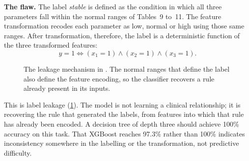 \documentclass[12pt,a4paper,oneside]{report}
\begin{document}
\textbf{The flaw.} The label \emph{stable} is defined as the condition in which all three parameters fall within the normal ranges of Tables~9 to~11. The feature transformation recodes each parameter as low, normal or high using those same ranges. After transformation, therefore, the label is a deterministic function of the three transformed features:
\begin{equation}
  y = 1 \iff (x_1 = 1) \wedge (x_2 = 1) \wedge (x_3 = 1).
\end{equation}

\begin{figure}[htbp]
\centering
{}
\caption{The leakage mechanism in \textcite{efendi2025}. The normal ranges that define the label also define the feature encoding, so the classifier recovers a rule already present in its inputs.}\label{fig:leakage}
\end{figure}

This is label leakage (\cref{fig:leakage}). The model is not learning a clinical relationship; it is recovering the rule that generated the labels, from features into which that rule has already been encoded. A decision tree of depth three should achieve 100\% accuracy on this task. That XGBoost reaches 97.3\% rather than 100\% indicates inconsistency somewhere in the labelling or the transformation, not predictive difficulty.
\end{document}
